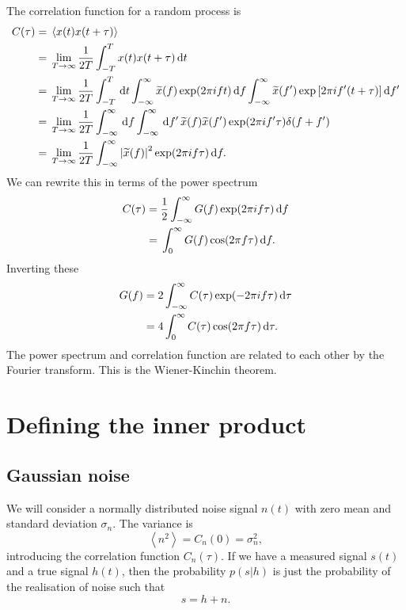 The correlation function for a random process is
\begin{align}
C(\tau) = {} & \left\langle x(t)x(t + \tau)\right\rangle \\
 = {} & \lim_{T \rightarrow \infty} \frac{1}{2T} \int_{-T}^{T}{x(t)x(t + \tau)}\,\mathrm{d}{t} \nonumber \\
 = {} & \lim_{T \rightarrow \infty} \frac{1}{2T} \int_{-T}^{T}\,\mathrm{d} t \int_{-\infty}^{\infty}{\widetilde{x}(f)\exp(2\pi ift)}\,\mathrm{d}{f} \int_{-\infty}^{\infty}{\widetilde{x}(f')\exp\left[2\pi if'(t + \tau)\right]}\,\mathrm{d}{f'} \nonumber \\
 = {} & \lim_{T \rightarrow \infty} \frac{1}{2T} \int_{-\infty}^{\infty}\,\mathrm{d} f \int_{-\infty}^{\infty}\,\mathrm{d} f' \, \widetilde{x}(f)\widetilde{x}(f')\exp(2\pi if'\tau)\delta(f + f') \nonumber \\
 = {} & \lim_{T \rightarrow \infty} \frac{1}{2T} \int_{-\infty}^{\infty}{\left|\widetilde{x}(f)\right|^2\exp(2\pi if\tau)}\,\mathrm{d}{f}.
\end{align}
We can rewrite this in terms of the power spectrum
\begin{align}
C(\tau) = {} & \frac{1}{2} \int_{-\infty}^{\infty}{G(f)\exp(2\pi if\tau)}\,\mathrm{d}{f} \\
 = {} & \int_{0}^{\infty}{G(f)\cos(2\pi f\tau)}\,\mathrm{d}{f}.
\end{align}
Inverting these
\begin{align}
G(f) = {} & 2 \int_{-\infty}^{\infty}{C(\tau)\exp(-2\pi i f\tau)}\,\mathrm{d}{\tau} \\
 = {} & 4 \int_{0}^{\infty}{C(\tau) \cos(2\pi f\tau)}\,\mathrm{d}{\tau}.
\end{align}
The power spectrum and correlation function are related to each other by the Fourier transform. This is the Wiener-Kinchin theorem.

\section{Defining the inner product}

\subsection{Gaussian noise}

We will consider a normally distributed noise signal $n(t)$ with zero mean and standard deviation $\sigma_n$. The variance is
\begin{equation}
\left\langle n^2 \right\rangle = C_n(0) = \sigma_n^2,
\end{equation}
introducing the correlation function $C_n(\tau)$. If we have a measured signal $s(t)$ and a true signal $h(t)$, then the probability $p(s|h)$ is just the probability of the realisation of noise such that
\begin{equation}
s = h + n.
\end{equation}

